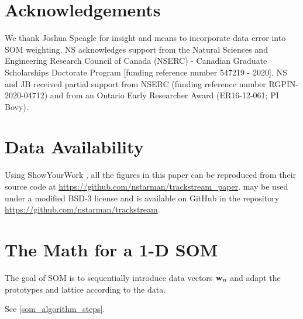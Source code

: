 \documentclass[fleqn,usenatbib]{mnras}
\begin{document}
\section*{Acknowledgements} \label{sec:acknowledgements}

  We thank Joshua Speagle for insight and means to incorporate data error into
  SOM weighting. NS acknowledges support from the Natural Sciences and
  Engineering Research Council of Canada (NSERC) - Canadian Graduate
  Scholarships Doctorate Program [funding reference number 547219 - 2020]. NS
  and JB  received partial support from NSERC (funding reference number
  RGPIN-2020-04712) and from an Ontario Early Researcher Award (ER16-12-061; PI
  Bovy).





\section*{Data Availability} \label{sec:data_availability}

  Using ShowYourWork \citep{Luger2021}, all the figures in this paper can be
  reproduced from their source code at
  \href{https://github.com/nstarman/trackstream_paper}{https://github.com/nstarman/trackstream\_paper}.
  \trackstream{} may be used under a modified BSD-3 license and is available
  on GitHub in the repository
  \href{https://github.com/nstarman/trackstream}{https://github.com/nstarman/trackstream}.
  









\appendix
\onecolumn


\section{The Math for a 1-D SOM}
\label{app:som_math}

    The goal of SOM is to sequentially introduce data vectors $\mathbf{w}_n$ and
    adapt the prototypes and lattice according to the data.

    See \autoref{som_algorithm_steps}.
\end{document}
